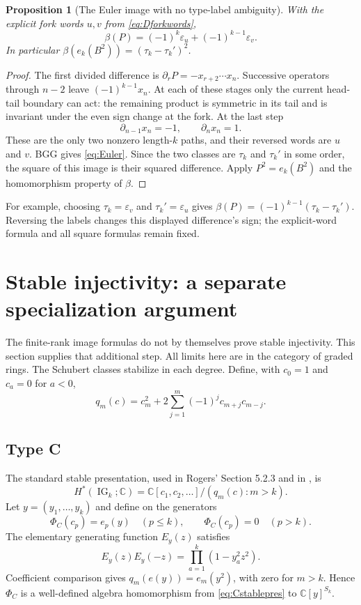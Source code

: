 \documentclass[11pt,letterpaper]{article}
\newtheorem{proposition}[theorem]{Proposition}
\theoremstyle{remark}
\newcommand{\eps}{\varepsilon}
\newcommand{\IG}{\operatorname{IG}}
\newcommand{\C}{\mathbb C}
\begin{document}
\begin{proposition}[The Euler image with no type-label ambiguity]\label{prop:Euler}
With the explicit fork words $u,v$ from \eqref{eq:Dforkwords},
\begin{equation}
 \boxed{\beta(P)=(-1)^k\eps_u+(-1)^{k-1}\eps_v.}
 \label{eq:Euler}
\end{equation}
In particular $\beta(e_k(B^2))=(\tau_k-\tau_k')^2$.
\end{proposition}
\begin{proof}
The first divided difference is $\partial_rP=-x_{r+2}\cdots x_n$. Successive operators through $n-2$ leave $(-1)^{k-1}x_n$. At each of these stages only the current head-tail boundary can act: the remaining product is symmetric in its tail and is invariant under the even sign change at the fork. At the last step
\[
 \partial_{n-1}x_n=-1,\qquad \partial_nx_n=1.
\]
These are the only two nonzero length-$k$ paths, and their reversed words are $u$ and $v$. BGG gives \eqref{eq:Euler}. Since the two classes are $\tau_k$ and $\tau_k'$ in some order, the square of this image is their squared difference. Apply $P^2=e_k(B^2)$ and the homomorphism property of $\beta$.
\end{proof}

For example, choosing $\tau_k=\eps_v$ and $\tau_k'=\eps_u$ gives $\beta(P)=(-1)^{k-1}(\tau_k-\tau_k')$. Reversing the labels changes this displayed difference's sign; the explicit-word formula and all square formulas remain fixed.

\section{Stable injectivity: a separate specialization argument}
\label{sec:stable}

The finite-rank image formulas do not by themselves prove stable injectivity. This section supplies that additional step. All limits here are in the category of graded rings. The Schubert classes stabilize in each degree. Define, with $c_0=1$ and $c_a=0$ for $a<0$,
\[
 q_m(c)=c_m^2+2\sum_{j=1}^{m}(-1)^j c_{m+j}c_{m-j}.
\]

\subsection{Type C}
The standard stable presentation, used in Rogers' Section 5.2.3 and in \cite[eq.~(13)]{KumarRogers}, is
\begin{equation}
 H^*(\IG_k;\C)=\C[c_1,c_2,\ldots]/(q_m(c):m>k).
 \label{eq:Cstablepres}
\end{equation}
Let $y=(y_1,\ldots,y_k)$ and define on the generators
\[
 \Phi_C(c_p)=e_p(y)\quad(p\leq k),\qquad
 \Phi_C(c_p)=0\quad(p>k).
\]
The elementary generating function $E_y(z)$ satisfies
\[
 E_y(z)E_y(-z)=\prod_{a=1}^{k}(1-y_a^2z^2).
\]
Coefficient comparison gives $q_m(e(y))=e_m(y^2)$, with zero for $m>k$. Hence $\Phi_C$ is a well-defined algebra homomorphism from \eqref{eq:Cstablepres} to $\C[y]^{S_k}$.
\end{document}
